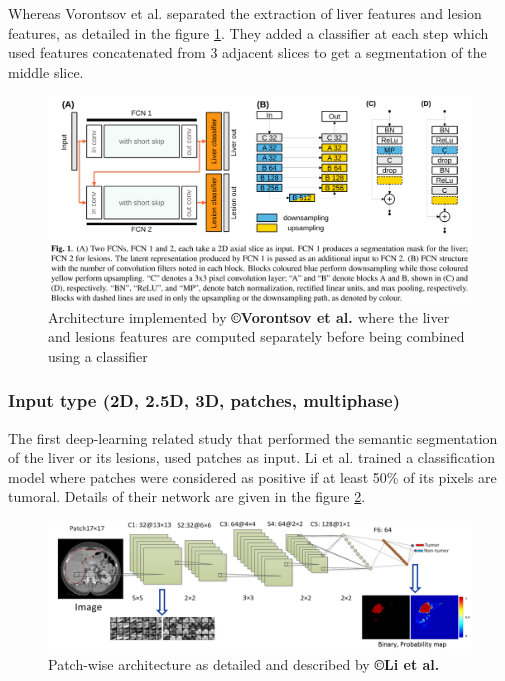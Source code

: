 Whereas Vorontsov et al. \cite{Vorontsov2018} separated the extraction of liver
features and lesion features, as detailed in the figure \ref{Vorontsov2018_Fig1}. They
added a classifier at each step which used features concatenated from 3
adjacent slices to get a segmentation of the middle slice.

\begin{figure}[th!]
	\centering
	\includegraphics[width=0.7\linewidth]{images/image17}
	\caption{Architecture implemented by \textbf{©Vorontsov et al. \cite{Vorontsov2018}} where the liver and lesions features are computed separately before being combined using a classifier }
	\label{Vorontsov2018_Fig1}
\end{figure}


\subsubsection{Input type (2D, 2.5D, 3D, patches, multiphase)}

The first deep-learning related study that performed the semantic
segmentation of the liver or its lesions, used patches as input.
Li et al. \cite{Li2015} trained a classification model where patches were
considered as positive if at least 50\% of its pixels are tumoral.
Details of their network are given in the figure \ref{Li2015_Patch_fig}.

\begin{figure}[th!]
	\centering
	\includegraphics[width=0.7\linewidth]{images/image2}
	\caption{Patch-wise architecture as detailed and described by \textbf{©Li et al. \cite{Li2015}}}
	\label{Li2015_Patch_fig}
\end{figure}


